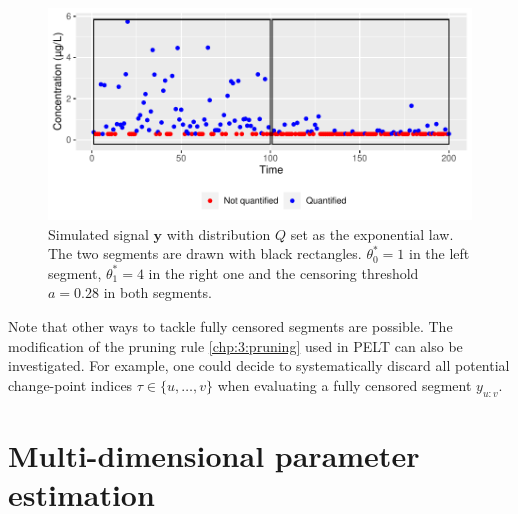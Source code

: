 \begin{figure}[ht]
    \centering
    \includegraphics{figs/Chap4/theta_max_ex.pdf}
    \caption{Simulated signal $\bm y$ with distribution $Q$ set as the exponential law. \\
    The two segments are drawn with black rectangles. $\theta^*_0 = 1$ in the left segment, $\theta^*_1 = 4$ in the right one and the censoring threshold $a = 0.28$ in both segments.}
    \label{fig:theta_max}
\end{figure}

Note that other ways to tackle fully censored segments are possible. The modification of the pruning rule \eqref{chp:3:pruning} used in PELT can also be investigated. For example, one could decide to systematically discard all potential change-point indices $\tau \in \{u,\dots,v\}$ when evaluating a fully censored segment $y_{u:v}$.  

\section{Multi-dimensional parameter estimation}\label{chp:4:3}



